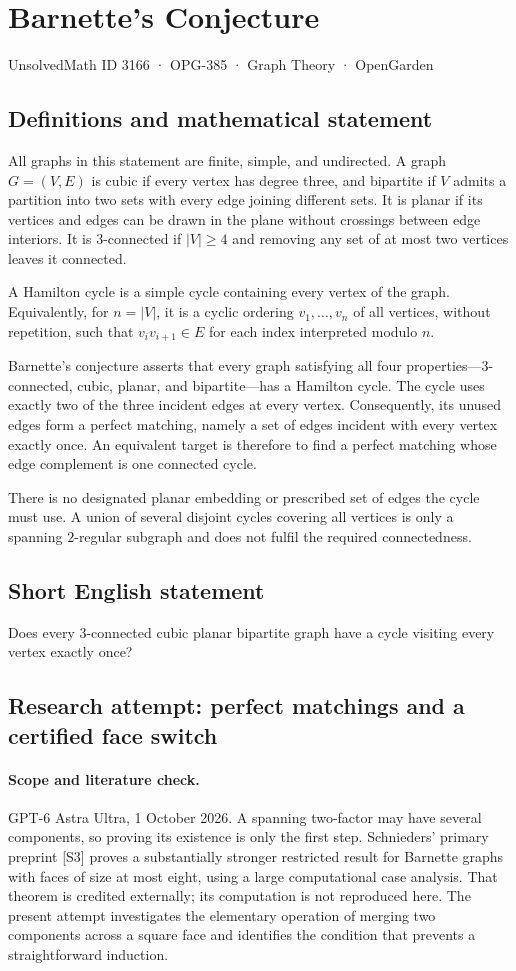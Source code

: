 \documentclass[11pt,a4paper]{article}
\begin{document}
\section*{Barnette's Conjecture}\label{3166}
{\small UnsolvedMath ID 3166 · OPG-385 · Graph Theory · OpenGarden}
\subsection{Definitions and mathematical statement}
All graphs in this statement are finite, simple, and undirected.
A graph $G=(V,E)$ is cubic if every vertex has degree three,
and bipartite if $V$ admits a partition into two sets with
every edge joining different sets. It is planar if its
vertices and edges can be drawn in the plane without crossings
between edge interiors. It is $3$-connected if $|V|\geq4$ and
removing any set of at most two vertices leaves it connected.

A Hamilton cycle is a simple cycle containing every vertex
of the graph. Equivalently, for $n=|V|$, it is a cyclic
ordering $v_1,\ldots,v_n$ of all vertices, without repetition,
such that $v_iv_{i+1}\in E$ for each index interpreted modulo
$n$.

Barnette's conjecture asserts that every graph satisfying
all four properties---$3$-connected, cubic, planar, and
bipartite---has a Hamilton cycle. The cycle uses exactly two
of the three incident edges at every vertex. Consequently,
its unused edges form a perfect matching, namely a set of
edges incident with every vertex exactly once. An equivalent
target is therefore to find a perfect matching whose edge
complement is one connected cycle.

There is no designated planar embedding or prescribed set
of edges the cycle must use. A union of several disjoint
cycles covering all vertices is only a spanning $2$-regular
subgraph and does not fulfil the required connectedness.
\subsection{Short English statement}
Does every 3-connected cubic planar bipartite graph have a cycle visiting every vertex exactly once?
\subsection{Research attempt: perfect matchings and a certified face switch}
\paragraph{Scope and literature check.}
GPT-6 Astra Ultra, 1 October 2026. A spanning two-factor may have
several components, so proving its existence is only the first step.
Schnieders' primary preprint [S3] proves a substantially stronger
restricted result for Barnette graphs with faces of size at most
eight, using a large computational case analysis. That theorem is
credited externally; its computation is not reproduced here. The present
attempt investigates the elementary operation of merging two components
across a square face and identifies the condition that prevents a
straightforward induction.
\end{document}

